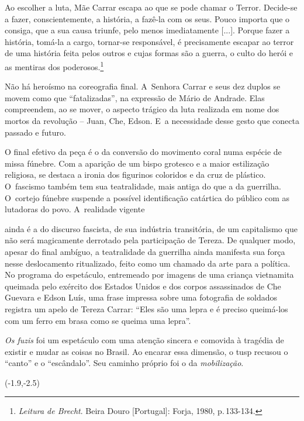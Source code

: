 \startblockquote
Ao escolher a luta, Mãe Carrar escapa ao que se pode chamar o Terror.
Decide-se a fazer, conscientemente, a história, a fazê-la com os seus.
Pouco importa que o consiga, que a sua causa triunfe, pelo menos
imediatamente {[}...{]}. Porque fazer a história, tomá-la a cargo,
tornar-se responsável, é precisamente escapar ao terror de uma história
feita pelos outros e cujas formas são a guerra, o culto do herói e as
mentiras dos poderosos.\footnote{{\it Leitura de Brecht}. Beira Douro
  {[}Portugal{]}: Forja, 1980, p.\,133-134.}
\stopblockquote

Não há heroísmo na coreografia final. A~Senhora Carrar e seus dez duplos
se movem como que “fatalizadas”, na expressão de Mário de Andrade. Elas
compreendem, ao se mover, o aspecto trágico da luta realizada em nome
dos mortos da revolução -- Juan, Che, Edson. E~a necessidade desse gesto
que conecta passado e futuro.

O final efetivo da peça é o da conversão do movimento coral numa espécie
de missa fúnebre. Com a aparição de um bispo grotesco e a maior
estilização religiosa, se destaca a ironia dos figurinos coloridos e da
cruz de plástico. O~fascismo também tem sua teatralidade, mais antiga do
que a da guerrilha. O~cortejo fúnebre suspende a possível identificação
catártica do público com as lutadoras do povo. A~realidade vigente

\column

\noindent{}ainda
é a do discurso fascista, de sua indústria transitória, de um
capitalismo que não será magicamente derrotado pela participação de
Tereza. De qualquer modo, apesar do final ambíguo, a teatralidade da
guerrilha ainda manifesta sua força nesse deslocamento ritualizado,
feito como um chamado da arte para a política. No programa do
espetáculo, entremeado por imagens de uma criança vietnamita queimada
pelo exército dos Estados Unidos e dos corpos assassinados de Che
Guevara e Edson Luís, uma frase impressa sobre uma fotografia de
soldados registra um apelo de Tereza Carrar: “Eles são uma lepra e é
preciso queimá-los com um ferro em brasa como se queima uma lepra”.

{\it Os fuzis} foi um espetáculo com uma atenção sincera e comovida à
tragédia de existir e mudar as coisas no Brasil. Ao encarar essa
dimensão, o {\sc tusp} recusou o “canto” e o “escândalo”. Seu caminho próprio
foi o da {\it mobilização}.

\startpositioning
   \position(-1.9,-2.5){}
\stoppositioning   

